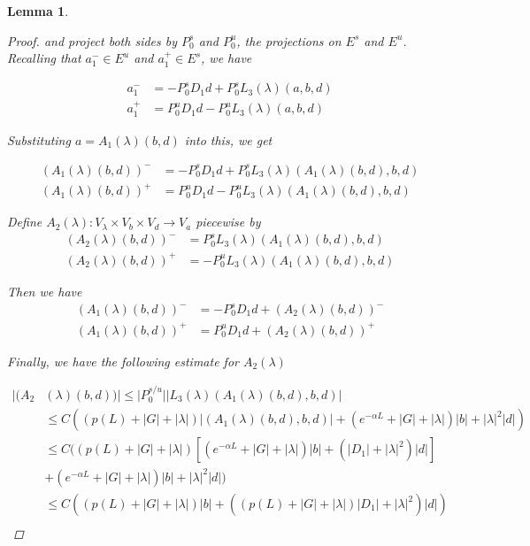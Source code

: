 \documentclass[12pt]{article}
\newtheorem{lemma}{Lemma}
\begin{document}
\begin{lemma}
\begin{proof}
and project both sides by $P_0^s$ and $P_0^u$, the projections on $E^s$ and $E^u$. Recalling that $a^-_1 \in E^u$ and $a^+_1 \in E^s$, we have

\begin{align*}
a^-_1 &= -P_0^s D_1 d + P_0^s L_3(\lambda)(a,b,d) \\
a^+_1 &= P_0^u D_1 d - P_0^u L_3(\lambda)(a,b,d)
\end{align*}

Substituting $a = A_1(\lambda)(b,d)$ into this, we get

\begin{align*}
(A_1(\lambda)(b,d))^- &= -P_0^s D_1 d + P_0^s L_3(\lambda)(A_1(\lambda)(b,d),b,d) \\
(A_1(\lambda)(b,d))^+ &= P_0^u D_1 d - P_0^u L_3(\lambda)(A_1(\lambda)(b,d),b,d)
\end{align*}

Define $A_2(\lambda): V_\lambda \times V_b \times V_d \rightarrow V_a$ piecewise by
\begin{align*}
(A_2(\lambda)(b,d))^- &= P_0^s L_3(\lambda)(A_1(\lambda)(b,d),b,d) \\
(A_2(\lambda)(b,d))^+ &= - P_0^u L_3(\lambda)(A_1(\lambda)(b,d),b,d)
\end{align*}

Then we have
\begin{align*}
(A_1(\lambda)(b,d))^- &= -P_0^s D_1 d + (A_2(\lambda)(b,d))^-\\
(A_1(\lambda)(b,d))^+ &= P_0^u D_1 d + (A_2(\lambda)(b,d))^+
\end{align*}

Finally, we have the following estimate for $A_2(\lambda)$

\begin{align*}
|(A_2&(\lambda)(b,d))| \leq |P_0^{s/u}|| L_3(\lambda)(A_1(\lambda)(b,d),b,d) |\\
&\leq C \left( (p(L) + |G| + |\lambda|)|(A_1(\lambda)(b,d),b,d)| + (e^{-\alpha L} + |G| + |\lambda|)|b| + |\lambda|^2|d| \right) \\
&\leq C ( (p(L) + |G| + |\lambda|)[(e^{-\alpha L} + |G| + |\lambda|)|b| + (|D_1| + |\lambda|^2)|d| ] \\
&+ (e^{-\alpha L} + |G| + |\lambda|)|b| + |\lambda|^2|d|) \\
&\leq C( (p(L) + |G| + |\lambda|)|b| + ((p(L) + |G| + |\lambda|)|D_1| + |\lambda|^2)|d| ) \\
\end{align*}

\end{proof}
\end{lemma}
\end{document}
